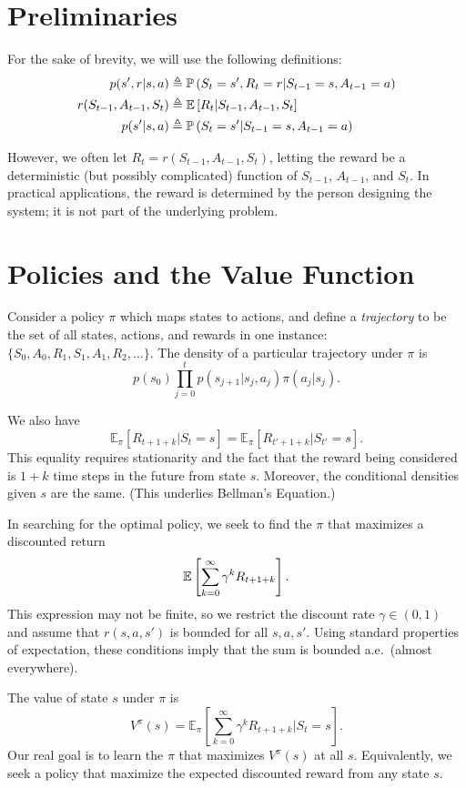 \documentclass[11pt]{article}
\begin{document}
\section{Preliminaries}

For the sake of brevity, we will use the following definitions:
\begin{align*}
p(s', r|s, a) &\triangleq \mathbb{P}\left( S_t = s', R_t = r|S_{t - 1} = s, A_{t-1}=a \right) \\
r(S_{t-1}, A_{t-1}, S_{t}) &\triangleq \mathbb{E}\left[ R_t | S_{t-1}, A_{t-1}, S_t \right] \\
p(s'|s, a) &\triangleq \mathbb{P}\left( S_t = s' | S_{t-1}=s, A_{t-1} = a \right)
\end{align*}

However, we often let $R_t = r(S_{t-1}, A_{t-1}, S_t)$, letting the reward be a deterministic (but possibly complicated) function of $S_{t-1}$, $A_{t-1}$, and $S_t$. In practical applications, the reward is determined by the person designing the system; it is not part of the underlying problem.

\section{Policies and the Value Function}

Consider a policy $\pi$ which maps states to actions, and define a \textit{trajectory} to be the set of all states, actions, and rewards in one instance: $\{S_0, A_0, R_1, S_1, A_1, R_2, \dots\}$. The density of a particular trajectory under $\pi$ is
$$p(s_0) \prod_{j = 0}^t p(s_{j + 1}|s_j,a_j)\pi(a_j|s_j).$$

We also have $$\mathbb{E}_\pi [R_{t+1+k} | S_t = s] = \mathbb{E}_{\pi} [R_{t'+1+k} | S_{t'} = s].$$ This equality requires stationarity and the fact that the reward being considered is $1 + k$ time steps in the future from state $s$. Moreover, the conditional densities given $s$ are the same. (This underlies Bellman's Equation.)

In searching for the optimal policy, we seek to find the $\pi$ that maximizes a discounted return $$\mathbb{E}\left[ \sum_{k = 0}^\infty \gamma^k R_{t + 1 + k} \right].$$ This expression may not be finite, so we restrict the discount rate $\gamma \in (0, 1)$ and assume that $r(s, a, s')$ is bounded for all $s, a, s'$. Using standard properties of expectation, these conditions imply that the sum is bounded a.e.~(almost everywhere).

The value of state $s$ under $\pi$ is $$V^\pi(s) = \mathbb{E}_\pi\left[\sum_{k = 0}^\infty \gamma^k R_{t + 1 + k}|S_t=s\right].$$ Our real goal is to learn the $\pi$ that maximizes $V^\pi(s)$ at all $s$. Equivalently, we seek a policy that maximize the expected discounted reward from any state $s$.
\end{document}
